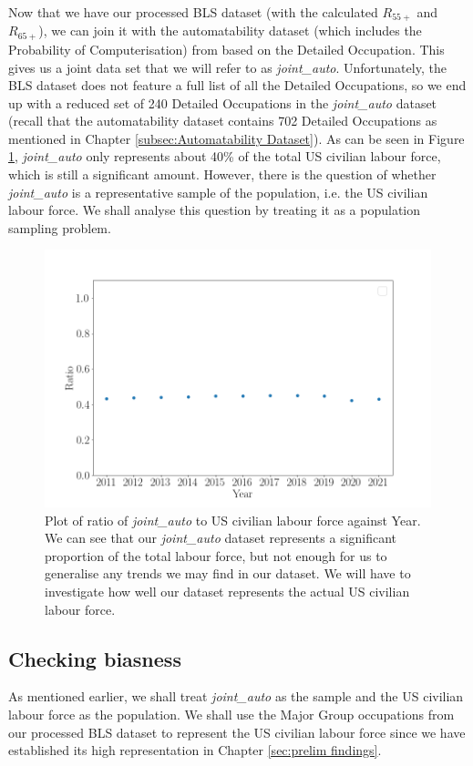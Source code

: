 \documentclass[11pt]{article}
\begin{document}
Now that we have our processed BLS dataset (with the calculated  $R_{55+}$ and $R_{65+}$), we can join it with the automatability dataset (which includes the Probability of Computerisation) from \cite{osborne2017future} based on the Detailed Occupation. This gives us a joint data set that we will refer to as \emph{joint\_auto}. Unfortunately, the BLS dataset does not feature a full list of all the Detailed Occupations, so we end up with a reduced set of 240 Detailed Occupations in the \emph{joint\_auto} dataset (recall that the automatability dataset contains 702 Detailed Occupations as mentioned in Chapter \ref{subsec:Automatability Dataset}). As can be seen in Figure \ref{fig:jointautoratio}, \emph{joint\_auto} only represents about 40\% of the total US civilian labour force, which is still a significant amount. However, there is the question of whether \emph{joint\_auto} is a representative sample of the population, i.e. the US civilian labour force. We shall analyse this question by treating it as a population sampling problem.

\begin{figure}[!htb]
	\centering
	\includegraphics[width=12cm]{Figures/joint_auto ratio scatter.png}
	\caption{Plot of ratio of \emph{joint\_auto} to US civilian labour force against Year. We can see that our \emph{joint\_auto} dataset represents a significant proportion of the total labour force, but not enough for us to generalise any trends we may find in our dataset. We will have to investigate how well our dataset represents the actual US civilian labour force.}
	\label{fig:jointautoratio}
\end{figure}


\subsection{Checking biasness}
\label{subsec:Checking biasness}
As mentioned earlier, we shall treat \emph{joint\_auto} as the sample and the US civilian labour force as the population. We shall use the Major Group occupations from our processed BLS dataset to represent the US civilian labour force since we have established its high representation in Chapter \ref{sec:prelim findings}.
\end{document}
